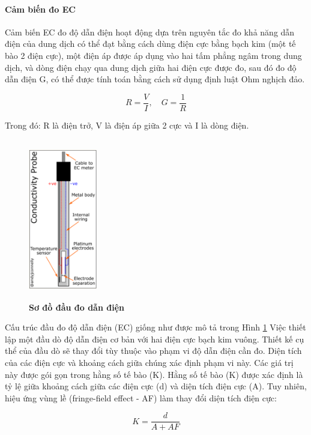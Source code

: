 \documentclass{article} %
\begin{document}
	\paragraph{Cảm biến đo EC }\mbox{}
	
	Cảm biến EC đo độ dẫn điện hoạt động dựa trên nguyên tắc đo khả năng dẫn điện của dung dịch có thể đạt bằng cách dùng điện cực bằng bạch kim (một tế bào 2 điện cực), một điện áp được áp dụng vào hai tấm phẳng ngâm trong dung dịch, và dòng điện chạy qua dung dịch giữa hai điện cực được đo, sau đó đo độ dẫn điện G, có thể được tính toán bằng cách sử dụng định luật Ohm nghịch đảo. 
	
	\begin{equation}
		R = \frac{V}{I}, \quad G = \frac{1}{R}    
	\end{equation}
	
	Trong đó: 
	R là điện trở, V  là điện áp giữa 2 cực và I là dòng điện.
	\begin{figure}[!ht]
		\centering
		\includegraphics[width=3cm,height=7cm]{Images/EC.png}
		\caption[Sơ đồ đầu đo dẫn điện\cite{EC}]{\bfseries \fontsize{12pt}{0pt}\selectfont Sơ đồ đầu đo dẫn điện\cite{EC}}
		\label{EC}
	\end{figure}
	
	Cấu trúc đầu đo độ dẫn điện (EC) giống như được mô tả trong Hình \ref{EC} Việc thiết lập một đầu dò độ dẫn điện cơ bản với hai điện cực bạch kim vuông. Thiết kế cụ thể của đầu dò sẽ thay đổi tùy thuộc vào phạm vi độ dẫn điện cần đo. Diện tích của các điện cực và khoảng cách giữa chúng xác định phạm vi này. Các giá trị này được gói gọn trong hằng số tế bào (K).
	Hằng số tế bào (K) được xác định là tỷ lệ giữa khoảng cách giữa các điện cực (d) và diện tích điện cực (A). Tuy nhiên, hiệu ứng vùng lề (fringe-field effect - AF) làm thay đổi diện tích điện cực:
	
	\begin{equation}
		K = \frac{d}{A + AF}
	\end{equation}
	
\end{document}

